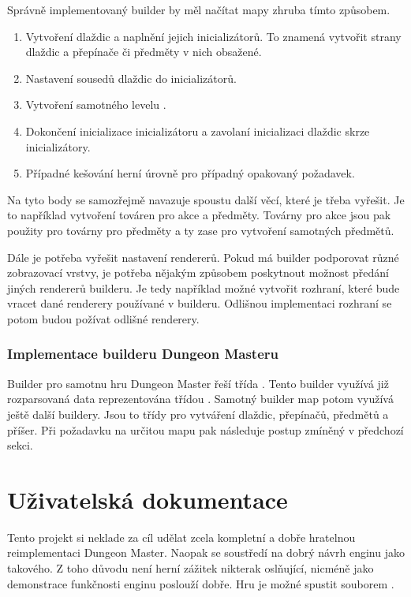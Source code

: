 Správně implementovaný builder by měl načítat mapy zhruba tímto způsobem. 

\begin{enumerate}

\item Vytvoření dlaždic a naplnění jejich inicializátorů. 
To znamená vytvořit strany dlaždic a přepínače či předměty v nich obsažené.

\item Nastavení sousedů dlaždic do inicializátorů. 

\item Vytvoření samotného levelu .

\item Dokončení inicializace inicializátoru a zavolaní inicializaci dlaždic skrze inicializátory. 

\item Případné kešování herní úrovně pro případný opakovaný požadavek. 
\end{enumerate}

Na tyto body se samozřejmě navazuje spoustu další věcí, které je třeba vyřešit. 
Je to například vytvoření továren pro akce a předměty. Továrny pro akce jsou pak použity pro
továrny pro předměty a ty zase pro vytvoření samotných předmětů. 

 Dále je potřeba vyřešit 
nastavení rendererů. Pokud má builder podporovat různé zobrazovací vrstvy, je potřeba 
nějakým způsobem poskytnout možnost předání jiných rendererů builderu. Je tedy například
možné vytvořit rozhraní, které bude vracet dané renderery používané v builderu. Odlišnou
implementaci rozhraní se potom budou požívat odlišné renderery.


\subsection{Implementace builderu Dungeon Masteru}
Builder pro samotnu hru Dungeon Master řeší třída . Tento builder
využívá již rozparsovaná data reprezentována třídou .
Samotný builder map potom využívá ještě další buildery. Jsou to třídy pro vytváření
dlaždic, přepínačů, předmětů a příšer. Při požadavku na určitou mapu pak 
následuje postup zmíněný v předchozí sekci.

\chapter{Uživatelská dokumentace}
Tento projekt si neklade za cíl udělat zcela kompletní a dobře hratelnou reimplementaci Dungeon Master.
Naopak se soustředí na dobrý návrh enginu jako takového. Z toho důvodu není herní zážitek nikterak
oslňující, nicméně jako demonstrace funkčnosti enginu poslouží dobře. Hru je možné spustit souborem
.

